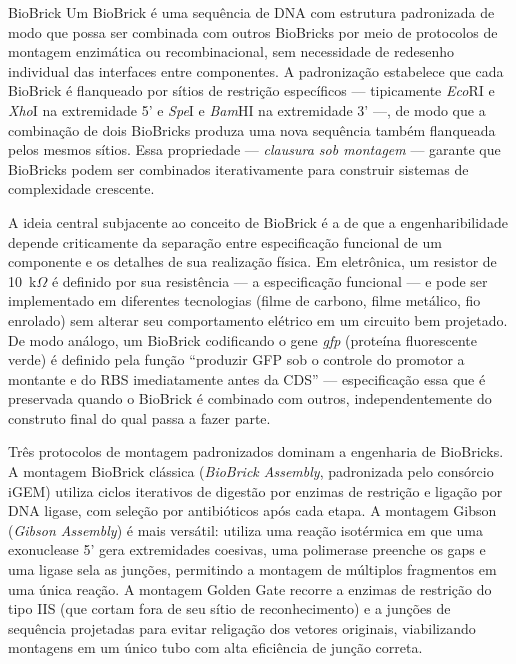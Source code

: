 \begin{definicao}{BioBrick}
Um BioBrick é uma sequência de DNA com estrutura padronizada de modo que possa ser combinada com outros BioBricks por meio de protocolos de montagem enzimática ou recombinacional, sem necessidade de redesenho individual das interfaces entre componentes. A padronização estabelece que cada BioBrick é flanqueado por sítios de restrição específicos --- tipicamente \emph{Eco}RI e \emph{Xho}I na extremidade 5' e \emph{Spe}I e \emph{Bam}HI na extremidade 3' ---, de modo que a combinação de dois BioBricks produza uma nova sequência também flanqueada pelos mesmos sítios. Essa propriedade --- \emph{clausura sob montagem} --- garante que BioBricks podem ser combinados iterativamente para construir sistemas de complexidade crescente.
\end{definicao}

A ideia central subjacente ao conceito de BioBrick é a de que a engenharibilidade depende criticamente da separação entre especificação funcional de um componente e os detalhes de sua realização física. Em eletrônica, um resistor de 10~k$\Omega$ é definido por sua resistência --- a especificação funcional --- e pode ser implementado em diferentes tecnologias (filme de carbono, filme metálico, fio enrolado) sem alterar seu comportamento elétrico em um circuito bem projetado. De modo análogo, um BioBrick codificando o gene \textit{gfp} (proteína fluorescente verde) é definido pela função ``produzir GFP sob o controle do promotor a montante e do RBS imediatamente antes da CDS'' --- especificação essa que é preservada quando o BioBrick é combinado com outros, independentemente do construto final do qual passa a fazer parte.

Três protocolos de montagem padronizados dominam a engenharia de BioBricks. A montagem BioBrick clássica (\emph{BioBrick Assembly}, padronizada pelo consórcio iGEM) utiliza ciclos iterativos de digestão por enzimas de restrição e ligação por DNA ligase, com seleção por antibióticos após cada etapa. A montagem Gibson (\emph{Gibson Assembly}) é mais versátil: utiliza uma reação isotérmica em que uma exonuclease 5' gera extremidades coesivas, uma polimerase preenche os gaps e uma ligase sela as junções, permitindo a montagem de múltiplos fragmentos em uma única reação. A montagem Golden Gate recorre a enzimas de restrição do tipo IIS (que cortam fora de seu sítio de reconhecimento) e a junções de sequência projetadas para evitar religação dos vetores originais, viabilizando montagens em um único tubo com alta eficiência de junção correta.

